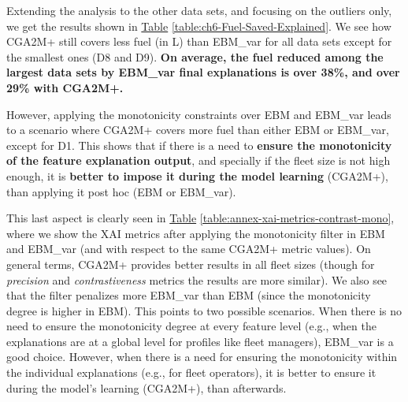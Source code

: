 Extending the analysis to the other data sets, and focusing on the outliers only, we get the results shown in \hyperref[table:ch6-Fuel-Saved-Explained]{Table} \ref{table:ch6-Fuel-Saved-Explained}. We see how CGA2M+ still covers less fuel (in L) than EBM\_var for all data sets except for the smallest ones (D8 and D9). \textbf{On average, the fuel reduced among the largest data sets by EBM\_var final explanations is over 38\%, and over 29\% with CGA2M+.}

However, applying the monotonicity constraints over EBM and EBM\_var leads to a scenario where CGA2M+ covers more fuel than either EBM or EBM\_var, except for D1. This shows that if there is a need to \textbf{ensure the monotonicity of the feature explanation output}, and specially if the fleet size is not high enough, it is \textbf{better to impose it during the model learning} (CGA2M+), than applying it post hoc (EBM or EBM\_var). 

This last aspect is clearly seen in \hyperref[table:annex-xai-metrics-contrast-mono]{Table} \ref{table:annex-xai-metrics-contrast-mono}, where we show the XAI metrics after applying the monotonicity filter in EBM and EBM\_var (and with respect to the same CGA2M+ metric values). On general terms, CGA2M+ provides better results in all fleet sizes (though for \textit{precision} and \textit{contrastiveness} metrics the results are more similar). We also see that the filter penalizes more EBM\_var than EBM (since the monotonicity degree is higher in EBM). This points to two possible scenarios. When there is no need to ensure the monotonicity degree at every feature level (e.g., when the explanations are at a global level for profiles like fleet managers), EBM\_var is a good choice. However, when there is a need for ensuring the monotonicity within the individual explanations (e.g., for fleet operators), it is better to ensure it during the model's learning (CGA2M+), than afterwards. 

